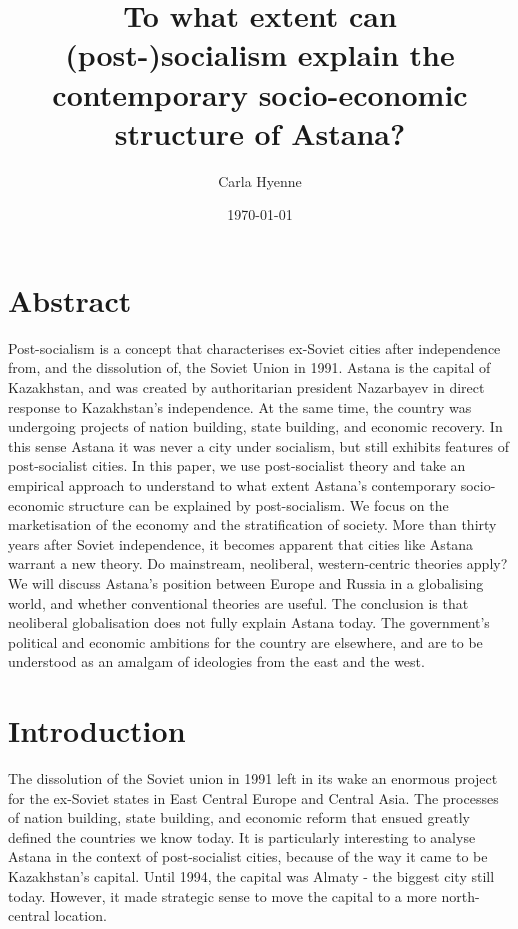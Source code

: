 \documentclass{article}
\title{To what extent can (post-)socialism explain the contemporary socio-economic structure of Astana?}
\author{Carla Hyenne}
\date{\today}
\begin{document}
\maketitle 

\section{Abstract}

Post-socialism is a concept that characterises ex-Soviet cities after independence from, and the dissolution of, the Soviet Union in 1991.
Astana is the capital of Kazakhstan, and was created by authoritarian president Nazarbayev in direct response to Kazakhstan's independence. At the same time, the country was undergoing projects of nation building, state building, and economic recovery. In this sense Astana it was never a city under socialism, but still exhibits features of post-socialist cities. In this paper, we use post-socialist theory and take an empirical approach to understand to what extent Astana's contemporary socio-economic structure can be explained by post-socialism. 
We focus on the marketisation of the economy and the stratification of society. 
More than thirty years after Soviet independence, it becomes apparent that cities like Astana warrant a new theory. Do mainstream, neoliberal, western-centric theories apply? We will discuss Astana's position between Europe and Russia in a globalising world, and whether conventional theories are useful. The conclusion is that neoliberal globalisation does not fully explain Astana today. The government's political and economic ambitions for the country are elsewhere, and are to be understood as an amalgam of ideologies from the east and the west.

\section{Introduction}

The dissolution of the Soviet union in 1991 left in its wake an enormous project for the ex-Soviet states in East Central Europe and Central Asia. The processes of nation building, state building, and economic reform that ensued greatly defined the countries we know today. It is particularly interesting to analyse Astana in the context of post-socialist cities, because of the way it came to be Kazakhstan's capital. 
Until 1994, the capital was Almaty - the biggest city still today. However, it made strategic sense to move the capital to a more north-central location. 
\end{document}
